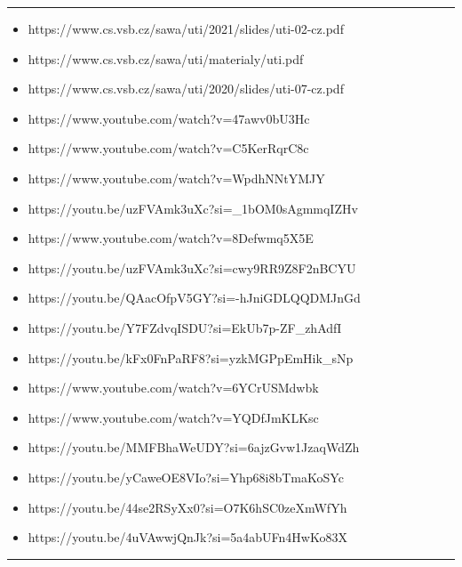 \documentclass{report}
\begin{document}
\vspace{0.4cm}    
\hrule
\vspace{0.1cm}
  \begin{itemize}
      \item[]https://www.cs.vsb.cz/sawa/uti/2021/slides/uti-02-cz.pdf
      \item[]https://www.cs.vsb.cz/sawa/uti/materialy/uti.pdf
      \item[]https://www.cs.vsb.cz/sawa/uti/2020/slides/uti-07-cz.pdf
      \item[]https://www.youtube.com/watch?v=47awv0bU3Hc
      \item[]https://www.youtube.com/watch?v=C5KerRqrC8c
      \item[]https://www.youtube.com/watch?v=WpdhNNtYMJY
      \item[]https://youtu.be/uzFVAmk3uXc?si=\_1bOM0sAgmmqIZHv
      \item[]https://www.youtube.com/watch?v=8Defwmq5X5E
      \item[]https://youtu.be/uzFVAmk3uXc?si=cwy9RR9Z8F2nBCYU
      \item[]https://youtu.be/QAacOfpV5GY?si=-hJniGDLQQDMJnGd
      \item[]https://youtu.be/Y7FZdvqISDU?si=EkUb7p-ZF\_zhAdfI 
      \item[]https://youtu.be/kFx0FnPaRF8?si=yzkMGPpEmHik\_sNp 
      \item[]https://www.youtube.com/watch?v=6YCrUSMdwbk
      \item[]https://www.youtube.com/watch?v=YQDfJmKLKsc 
      \item[]https://youtu.be/MMFBhaWeUDY?si=6ajzGvw1JzaqWdZh
      \item[]https://youtu.be/yCaweOE8VIo?si=Yhp68i8bTmaKoSYc 
      \item[]https://youtu.be/44se2RSyXx0?si=O7K6hSC0zeXmWfYh
      \item[] https://youtu.be/4uVAwwjQnJk?si=5a4abUFn4HwKo83X
      
  \end{itemize}
\vspace{0.1cm}    
\hrule
\vspace{0.4cm}  
\end{document}
